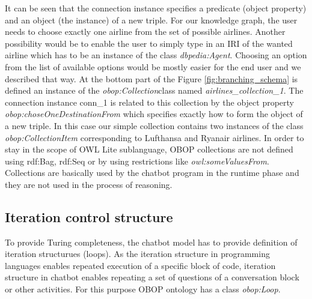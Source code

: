 \documentclass[runningheads]{llncs}
\begin{document}
It can be seen that the connection instance specifies a predicate (object property) and an object (the instance) of a new triple. For our knowledge graph, the user needs to choose exactly one airline from the set of possible airlines. Another possibility would be to enable the user to simply type in an IRI of the wanted airline which has to be an instance of the class \textit{dbpedia:Agent}. Choosing an option from the list of available options would be mostly easier for the end user and we described that way. At the bottom part of the Figure \ref{fig:branching_schema} is defined an instance of the \textit{obop:Collection}class named \textit{airlines\_collection\_1}. The connection instance conn\_1 is related to this collection by the object property \textit{obop:choseOneDestinationFrom} which specifies exactly how to form the object of a new triple. In this case our simple collection contains two instances of the class \textit{obop:CollectionItem} corresponding to Lufthansa and Ryanair airlines. 
In order to stay in the scope of OWL Lite sublanguage, OBOP collections are not defined using rdf:Bag, rdf:Seq or by using restrictions like \textit{owl:someValuesFrom}. Collections are basically used by the chatbot program in the runtime phase and they are not used in the process of reasoning.     


\FloatBarrier 
\subsection {Iteration control structure}
To provide Turing completeness, the chatbot model has to provide definition of iteration structurues (loops). As the iteration structure in programming languages enables repeated execution of a specific block of code, iteration structure in chatbot enables repeating a set of questions of a conversation block or other activities. For this purpose OBOP ontology has a class \textit{obop:Loop}. 
\end{document}
